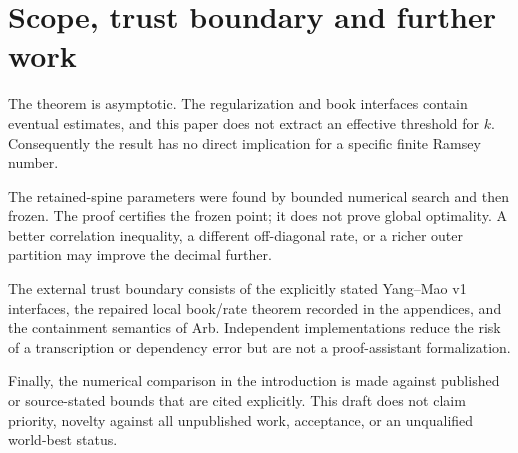 \section{Scope, trust boundary and further work}\label{sec:limitations}

The theorem is asymptotic.  The regularization and book interfaces contain
eventual estimates, and this paper does not extract an effective threshold
for \(k\).  Consequently the result has no direct implication for a specific
finite Ramsey number.

The retained-spine parameters were found by bounded numerical search and then
frozen.  The proof certifies the frozen point; it does not prove global
optimality.  A better correlation inequality, a different off-diagonal rate,
or a richer outer partition may improve the decimal further.

The external trust boundary consists of the explicitly stated Yang--Mao v1
interfaces, the repaired local book/rate theorem recorded in the appendices,
and the containment semantics of Arb.  Independent implementations reduce
the risk of a transcription or dependency error but are not a proof-assistant
formalization.

Finally, the numerical comparison in the introduction is made against
published or source-stated bounds that are cited explicitly.  This draft does
not claim priority, novelty against all unpublished work, acceptance, or an
unqualified world-best status.

